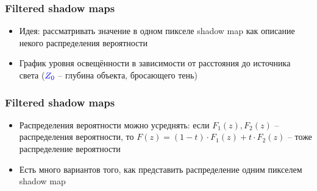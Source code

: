 \documentclass{beamer}
\begin{document}
\begin{frame}[fragile]
\frametitle{Filtered shadow maps}
\begin{itemize}
\item Идея: рассматривать значение в одном пикселе shadow map как описание некого распределения вероятности
\pause
\item График уровня освещённости в зависимости от расстояния до источника света (\begin{math}\color{blue}Z_0\end{math} -- глубина объекта, бросающего тень)
\end{itemize}
\begin{center}
\end{center}
\end{frame}

\begin{frame}[fragile]
\frametitle{Filtered shadow maps}
\begin{itemize}
\item Распределения вероятности можно усреднять: если \begin{math}F_1(z), F_2(z)\end{math} -- распределения вероятности, то \begin{math}F(z) = (1 - t) \cdot F_1(z) + t \cdot F_2(z)\end{math} -- тоже распределение вероятности
\pause
\item Есть много вариантов того, как представить распределение одним пикселем shadow map
\end{itemize}
\end{frame}
\end{document}
